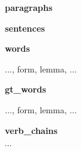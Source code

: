\documentclass[landscape,footrule]{foils}
\begin{document}
\begin{triangles}
\item \textbf{paragraphs}
\item \textbf{sentences}
\item \textbf{words} \vspace*{0.5ex} 
\begin{triangles}
\item {} \vspace*{0.5ex}
\begin{diamonds}
\item $\ldots$, form, lemma, $\ldots$\vspace*{1ex}
\end{diamonds} 
\item {} 
\item {} \vspace*{1ex}
\end{triangles}
\item \textbf{gt\_words} \vspace*{0.5ex} 
\begin{triangles}
\item {} \vspace*{0.5ex}
\begin{diamonds}
\item $\ldots$, form, lemma, $\ldots$\vspace*{2ex}
\end{diamonds}  
\end{triangles}
\item \textbf{verb\_chains}
\item \textbf{$\cdots$}
\end{triangles}
\end{document}
